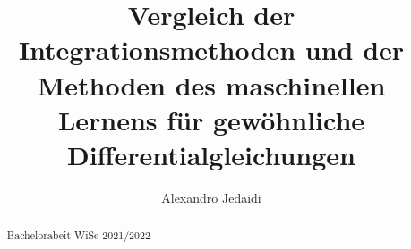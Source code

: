\documentclass[
    paper=a4, %
    fontsize=12pt,  %
    oneside,        %
    headsepline,    %
    notitlepage     %
]{extarticle}         %
\author{Alexandro Jedaidi}
\title{\textbf{Vergleich der Integrationsmethoden und der Methoden des maschinellen Lernens für gewöhnliche Differentialgleichungen}}
\date{}
\numberwithin{equation}{section}
\begin{document}
    \maketitle
    \tableofcontents
    \newpage
    \begin{abstract}
        Bachelorabeit WiSe 2021/2022
    \end{abstract}
    \pagestyle{headings}

    

    

    

    

    

    

    \newpage
    \printbibliography[heading=bibintoc]
    \newpage
    \listoffigures
\end{document}
